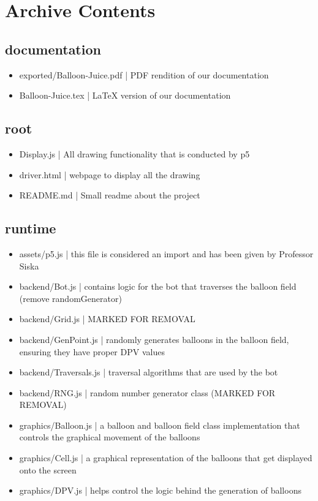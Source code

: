 \documentclass{article}
\begin{document}
\newpage

\section{Archive Contents}

\subsection{documentation}
\begin{itemize}
\item exported/Balloon-Juice.pdf | PDF rendition of our documentation
\item Balloon-Juice.tex | LaTeX version of our documentation
\end{itemize}

\subsection{root}

\begin{itemize}
\item Display.js | All drawing functionality that is conducted by p5
\item driver.html | webpage to display all the drawing
\item README.md | Small readme about the project
\end{itemize}

\subsection{runtime}

\begin{itemize}
\item assets/p5.js | this file is considered an import and has been given by Professor Siska
\item backend/Bot.js | contains logic for the bot that traverses the balloon field (remove randomGenerator)
\item backend/Grid.js | MARKED FOR REMOVAL
\item backend/GenPoint.js | randomly generates balloons in the balloon field, ensuring they have proper DPV values
\item backend/Traversals.js | traversal algorithms that are used by the bot
\item backend/RNG.js | random number generator class (MARKED FOR REMOVAL)
\item graphics/Balloon.js | a balloon and balloon field class implementation that controls the graphical movement of the balloons
\item graphics/Cell.js | a graphical representation of the balloons that get displayed onto the screen
\item graphics/DPV.js | helps control the logic behind the generation of balloons
\end{itemize}
\end{document}

